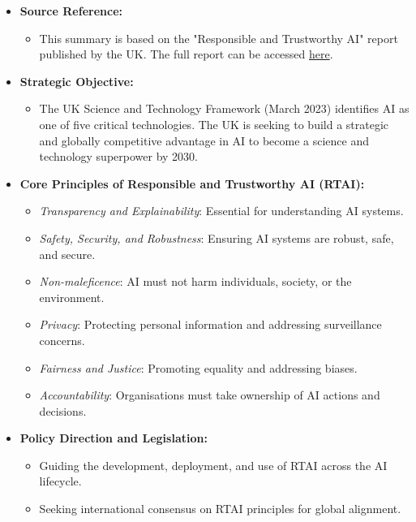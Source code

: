 \begin{itemize}
    \item \textbf{Source Reference:}
    \begin{itemize}
        \item This summary is based on the "Responsible and Trustworthy AI" report published by the UK. The full report can be accessed \href{https://iuk.ktn-uk.org/wp-content/uploads/2023/10/responsible-trustworthy-ai-report.pdf}{here}.
    \end{itemize}

    \item \textbf{Strategic Objective:}
    \begin{itemize}
        \item The UK Science and Technology Framework (March 2023) identifies AI as one of five critical technologies. The UK is seeking to build a strategic and globally competitive advantage in AI to become a science and technology superpower by 2030.
    \end{itemize}

    \item \textbf{Core Principles of Responsible and Trustworthy AI (RTAI):}
    \begin{itemize}
        \item \textit{Transparency and Explainability}: Essential for understanding AI systems.
        \item \textit{Safety, Security, and Robustness}: Ensuring AI systems are robust, safe, and secure.
        \item \textit{Non-maleficence}: AI must not harm individuals, society, or the environment.
        \item \textit{Privacy}: Protecting personal information and addressing surveillance concerns.
        \item \textit{Fairness and Justice}: Promoting equality and addressing biases.
        \item \textit{Accountability}: Organisations must take ownership of AI actions and decisions.
    \end{itemize}

    \item \textbf{Policy Direction and Legislation:}
    \begin{itemize}
        \item Guiding the development, deployment, and use of RTAI across the AI lifecycle.
        \item Seeking international consensus on RTAI principles for global alignment.
    \end{itemize}


\end{itemize}
